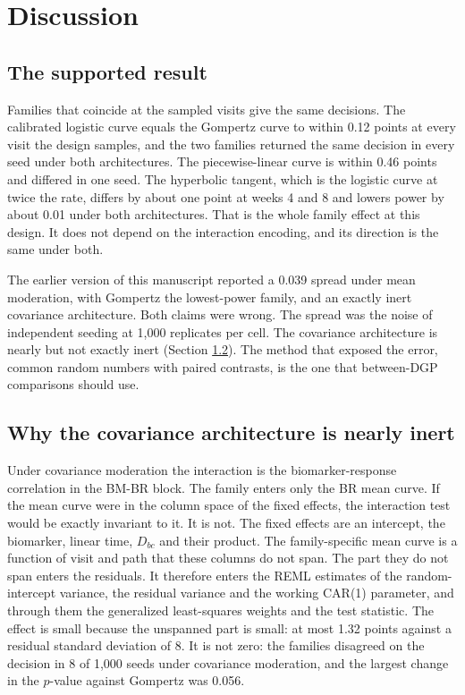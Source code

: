 \documentclass[
  11pt,
]{article}
\begin{document}
\section{Discussion}\label{discussion}

\subsection{The supported result}\label{the-supported-result}

Families that coincide at the sampled visits give the same decisions.
The calibrated logistic curve equals the Gompertz curve to within
0.12 points at every
visit the design samples, and the two families returned the same
decision in every seed under both architectures. The piecewise-linear
curve is within
0.46
points and differed in one seed. The hyperbolic tangent, which is the
logistic curve at twice the rate, differs by about one point at weeks
4 and 8 and lowers power by about 0.01 under both architectures. That
is the whole family effect at this design. It does not depend on the
interaction encoding, and its direction is the same under both.

The earlier version of this manuscript reported a 0.039 spread under
mean moderation, with Gompertz the lowest-power family, and an exactly
inert covariance architecture. Both claims were wrong. The spread was
the noise of independent seeding at 1,000 replicates per cell. The
covariance architecture is nearly but not exactly inert (Section
\ref{inert}). The method that exposed the error, common random
numbers with paired contrasts, is the one that between-DGP comparisons
should use.

\subsection{Why the covariance architecture is nearly inert}\label{inert}

Under covariance moderation the interaction is the biomarker-response
correlation in the BM-BR block. The family enters only the BR mean
curve. If the mean curve were in the column space of the fixed
effects, the interaction test would be exactly invariant to it. It is
not. The fixed effects are an intercept, the biomarker, linear time,
\(D_{bc}\) and their product. The family-specific mean curve is a
function of visit and path that these columns do not span. The part
they do not span enters the residuals. It therefore enters the REML
estimates of the random-intercept variance, the residual variance and
the working CAR(1) parameter, and through them the generalized
least-squares weights and the test statistic. The effect is small
because the unspanned part is small: at most
1.32 points
against a residual standard deviation of 8.
It is not zero: the families disagreed on the decision in 8 of 1,000 seeds under covariance moderation, and the largest change in the \(p\)-value against Gompertz was 0.056.
\end{document}
